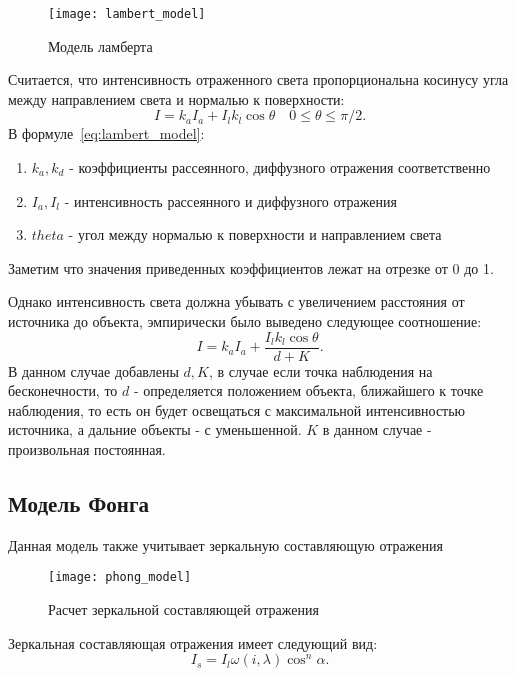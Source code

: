 \begin{figure}[h]
	\centering
	\texttt{[image: lambert\_model]}
	\caption{Модель ламберта}
	\label{fig:lambert_model}
\end{figure}

Считается, что интенсивность отраженного света
пропорциональна косинусу угла между направлением света и нормалью к поверхности:
\begin{equation} 
	I = k_aI_a + I_lk_l\cos\theta \quad 0 \leq \theta \leq \pi/2.
	\label{eq:lambert_model}
\end{equation}
В  формуле~\ref{eq:lambert_model}:
\begin{enumerate}
	\item $k_a,k_d$ - коэффициенты рассеянного, диффузного отражения соответственно
	\item $I_a,I_l$ - интенсивность рассеянного и диффузного отражения 
	\item $theta$ - угол между нормалью к поверхности и направлением света
\end{enumerate}
Заметим что значения приведенных коэффициентов лежат на отрезке от 0 до 1.

Однако интенсивность света должна убывать с увеличением расстояния от источника до объекта, эмпирически было выведено следующее соотношение:
\begin{equation} 
	I = k_aI_a + \frac{I_lk_l\cos\theta}{d + K}.
	\label{eq:lambert_model_space}
\end{equation}
В данном случае добавлены $d,K$, в случае если точка наблюдения на бесконечности, то $d$ - определяется положением объекта,
ближайшего к точке наблюдения, то есть он будет освещаться с максимальной интенсивностью источника, а дальние объекты - с уменьшенной.
$K$ в данном случае - произвольная постоянная. \cite{Rodgers}


\subsection{Модель Фонга}
Данная модель также учитывает зеркальную составляющую отражения
\begin{figure}[h]
	\centering
	\texttt{[image: phong\_model]}
	\caption{Расчет зеркальной составляющей отражения}
	\label{fig:phong_model}
\end{figure}
\newline
Зеркальная составляющая отражения имеет следующий вид:
\begin{equation} 
	I_s = I_l\omega(i,\lambda)\cos^n \alpha.
	\label{eq:phong_model}
\end{equation}

